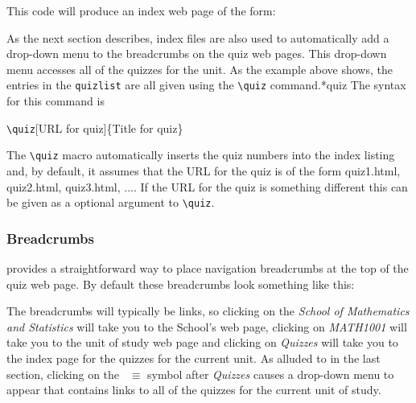 \documentclass[svgnames]{article}
\begin{document}
  

  This code will produce an index web page of the form:


  As the next section describes, index files are also used to
  automatically add a drop-down menu to the breadcrumbs on the quiz web
  pages. This drop-down menu accesses all of the quizzes for the unit.
  As the example above shows, the entries in the \Verb|quizlist| are all
  given using the \Verb|\quiz| command.*{quiz} The syntax for this command is

  \begin{center}
      \Verb|\quiz|[URL for quiz]\{Title for quiz\}
  \end{center}

  \noindent
  The \Verb|\quiz| macro automatically inserts the quiz numbers
  into the index listing and, by default, it assumes that the URL for the quiz
  is of the form \textsf{quiz1.html}, \textsf{quiz2.html},
  \textsf{quiz3.html}, .... If the URL for the quiz is something
  different this can be given as a optional argument to \Verb|\quiz|.

  \subsubsection{Breadcrumbs}\label{SS:breadcrumbs}

  \MathQuiz provides a straightforward way to place navigation breadcrumbs
  at the top of the quiz web page. By default these
  breadcrumbs look something like this:


  \noindent
  The breadcrumbs will typically be links, so clicking on the
  \textit{School of Mathematics and Statistics} will take you to the
  School's web page, clicking on \textit{MATH1001} will take you to the
  unit of study web page and clicking on \textit{Quizzes} will take you
  to the index page for the quizzes for the current unit. As alluded to
  in the last section, clicking on the~{\large\color{red} $\equiv$} symbol after
  \textit{Quizzes} causes a drop-down menu to appear that
  contains links to all of the quizzes for the current unit of study.

\end{document}
